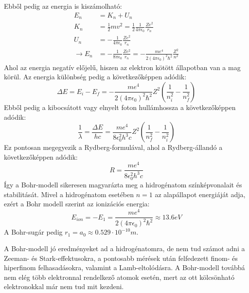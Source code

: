 \documentclass[../main.tex]{subfiles}
\begin{document}
Ebből pedig az energia is kiszámolható:
\begin{equation}
    \begin{aligned}
        E_n &= K_n + U_n \\
        K_n &= \frac{1}{2} m v^2 = \frac{1}{2} \frac{1}{4 \pi \epsilon_0} \frac{Z e^2}{r_n} \\
        U_n &= - \frac{1}{4 \pi \epsilon_0} \frac{Z e^2}{r_n} \\
        \rightarrow E_n &= - \frac{1}{8 \pi \epsilon_0} \frac{Z e^2}{r_n} = - \frac{m e^4}{2 (4 \pi \epsilon_0)^2 \hbar^2} \frac{Z^2}{n^2}
    \end{aligned}
\end{equation}
Ahol az energia negatív előjelű, hiszen az elektron kötött állapotban van a mag körül. Az energia különbség pedig a következőképpen adódik:
\begin{equation}
    \Delta E = E_i - E_f = - \frac{m e^4}{2 (4 \pi \epsilon_0)^2 \hbar^2} Z^2 \left( \frac{1}{n_i^2} - \frac{1}{n_f^2} \right)
\end{equation}
Ebből pedig a kibocsátott vagy elnyelt foton hullámhossza a következőképpen adódik:
\begin{equation}
    \frac{1}{\lambda} = \frac{\Delta E}{hc} = \frac{m e^4}{8 \epsilon_0^2 h^3 c} Z^2 \left( \frac{1}{n_f^2} - \frac{1}{n_i^2} \right)
\end{equation}
Ez pontosan megegyezik a Rydberg-formulával, ahol a Rydberg-állandó a következőképpen adódik:
\begin{equation}
    R = \frac{m e^4}{8 \epsilon_0^2 h^3 c}
\end{equation}
Így a Bohr-modell sikeresen magyarázta meg a hidrogénatom színképvonalait és stabilitását. Mivel a hidrogénatom esetében $n = 1$ az alapállapot energiáját adja, ezért a Bohr modell szerint az ionizációs energia:
\begin{equation}
    E_{ion} = - E_1 = \frac{m e^4}{2 (4 \pi \epsilon_0)^2 \hbar^2} \approx 13.6 eV
\end{equation}
A Bohr-sugár pedig $r_1 = a_0 \approx 0.529 \cdot 10^{-10} m$.

A Bohr-modell jó eredményeket ad a hidrogénatomra, de nem tud számot adni a Zeeman- és Stark-effektusokra, a pontosabb mérések után felfedezett finom- és hiperfinom felhasadásokra, valamint a Lamb-eltolódásra.
A Bohr-modell továbbá nem elég több elektronnal rendelkező atomok esetén, mert az ott kölcsönható elektronokkal már nem tud mit kezdeni. 
\end{document}

